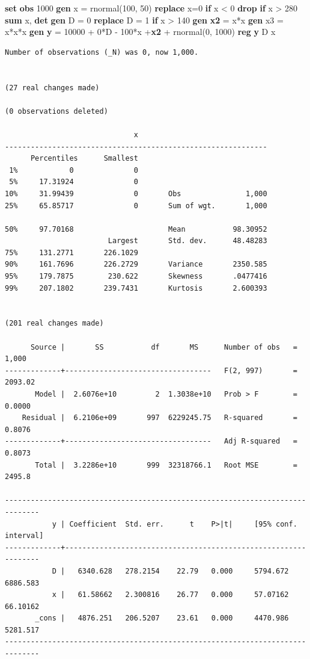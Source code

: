 \documentclass[
]{book}
\newenvironment{Shaded}{\begin{snugshade}}{\end{snugshade}}
\newcommand{\FunctionTok}[1]{\textcolor[rgb]{0.13,0.29,0.53}{\textbf{#1}}}
\newcommand{\KeywordTok}[1]{\textcolor[rgb]{0.13,0.29,0.53}{\textbf{#1}}}
\newcommand{\NormalTok}[1]{#1}
\begin{document}
\begin{Shaded}
\begin{Highlighting}[]
\KeywordTok{set} \KeywordTok{obs}\NormalTok{ 1000}
\KeywordTok{gen}\NormalTok{ x = rnormal(100, 50)}
\KeywordTok{replace}\NormalTok{ x=0 }\KeywordTok{if}\NormalTok{ x \textless{} 0}
\KeywordTok{drop} \KeywordTok{if}\NormalTok{ x \textgreater{} 280}
\KeywordTok{sum}\NormalTok{ x, }\FunctionTok{det}
\KeywordTok{gen}\NormalTok{ D = 0}
\KeywordTok{replace}\NormalTok{ D = 1 }\KeywordTok{if}\NormalTok{ x \textgreater{} 140}
\KeywordTok{gen} \KeywordTok{x2}\NormalTok{ = x*x}
\KeywordTok{gen}\NormalTok{ x3 = x*x*x}
\KeywordTok{gen} \FunctionTok{y}\NormalTok{ = 10000 + 0*D {-} 100*x +}\KeywordTok{x2}\NormalTok{ + rnormal(0, 1000)}
\KeywordTok{reg} \FunctionTok{y}\NormalTok{ D x}
\end{Highlighting}
\end{Shaded}

\begin{verbatim}
Number of observations (_N) was 0, now 1,000.


(27 real changes made)

(0 observations deleted)

                              x
-------------------------------------------------------------
      Percentiles      Smallest
 1%            0              0
 5%     17.31924              0
10%     31.99439              0       Obs               1,000
25%     65.85717              0       Sum of wgt.       1,000

50%     97.70168                      Mean           98.30952
                        Largest       Std. dev.      48.48283
75%     131.2771       226.1029
90%     161.7696       226.2729       Variance       2350.585
95%     179.7875        230.622       Skewness       .0477416
99%     207.1802       239.7431       Kurtosis       2.600393


(201 real changes made)

      Source |       SS           df       MS      Number of obs   =     1,000
-------------+----------------------------------   F(2, 997)       =   2093.02
       Model |  2.6076e+10         2  1.3038e+10   Prob > F        =    0.0000
    Residual |  6.2106e+09       997  6229245.75   R-squared       =    0.8076
-------------+----------------------------------   Adj R-squared   =    0.8073
       Total |  3.2286e+10       999  32318766.1   Root MSE        =    2495.8

------------------------------------------------------------------------------
           y | Coefficient  Std. err.      t    P>|t|     [95% conf. interval]
-------------+----------------------------------------------------------------
           D |   6340.628   278.2154    22.79   0.000     5794.672    6886.583
           x |   61.58662   2.300816    26.77   0.000     57.07162    66.10162
       _cons |   4876.251   206.5207    23.61   0.000     4470.986    5281.517
------------------------------------------------------------------------------
\end{verbatim}
\end{document}
